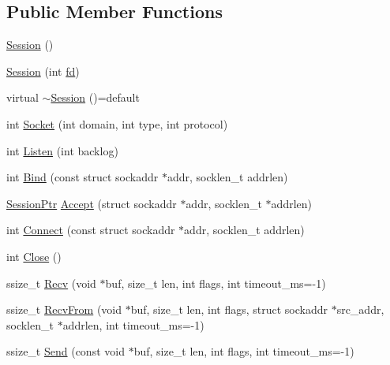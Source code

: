 \subsection*{Public Member Functions}
\begin{DoxyCompactItemize}
\item 
\hyperlink{classapollo_1_1cyber_1_1io_1_1Session_a2e33227015f8c9550a460927d1459152}{Session} ()
\item 
\hyperlink{classapollo_1_1cyber_1_1io_1_1Session_af0c871498862dad8be0a49d49cfb2961}{Session} (int \hyperlink{classapollo_1_1cyber_1_1io_1_1Session_aec8faaa2371913967925e7252a02e985}{fd})
\item 
virtual \hyperlink{classapollo_1_1cyber_1_1io_1_1Session_a625811741be5b68f5f862148ff6e9b3a}{$\sim$\-Session} ()=default
\item 
int \hyperlink{classapollo_1_1cyber_1_1io_1_1Session_afc19fa1fb169c4e45fa7fd8bd290b7ad}{Socket} (int domain, int type, int protocol)
\item 
int \hyperlink{classapollo_1_1cyber_1_1io_1_1Session_a46a8b85f7962f93a735ae91769cffca6}{Listen} (int backlog)
\item 
int \hyperlink{classapollo_1_1cyber_1_1io_1_1Session_a8cdfa3b205b6f3539a179388fb416c9a}{Bind} (const struct sockaddr $\ast$addr, socklen\-\_\-t addrlen)
\item 
\hyperlink{classapollo_1_1cyber_1_1io_1_1Session_a1dff3f4dc860a04ae4a7a0c9d0e8de4f}{Session\-Ptr} \hyperlink{classapollo_1_1cyber_1_1io_1_1Session_a63db2f72fe4c034d982a92532ab8ed6b}{Accept} (struct sockaddr $\ast$addr, socklen\-\_\-t $\ast$addrlen)
\item 
int \hyperlink{classapollo_1_1cyber_1_1io_1_1Session_ae86ffa6d078adb9d223ff72c8460fb16}{Connect} (const struct sockaddr $\ast$addr, socklen\-\_\-t addrlen)
\item 
int \hyperlink{classapollo_1_1cyber_1_1io_1_1Session_a9dbc40f13c58d5aa1c760228b7d68df5}{Close} ()
\item 
ssize\-\_\-t \hyperlink{classapollo_1_1cyber_1_1io_1_1Session_a9173bcc8c7faa52bf3128f6cd6e47899}{Recv} (void $\ast$buf, size\-\_\-t len, int flags, int timeout\-\_\-ms=-\/1)
\item 
ssize\-\_\-t \hyperlink{classapollo_1_1cyber_1_1io_1_1Session_a0df623d371f8c370af437e1ebbc1b05e}{Recv\-From} (void $\ast$buf, size\-\_\-t len, int flags, struct sockaddr $\ast$src\-\_\-addr, socklen\-\_\-t $\ast$addrlen, int timeout\-\_\-ms=-\/1)
\item 
ssize\-\_\-t \hyperlink{classapollo_1_1cyber_1_1io_1_1Session_ae0384c6e9dba4f075d9a9f3435036334}{Send} (const void $\ast$buf, size\-\_\-t len, int flags, int timeout\-\_\-ms=-\/1)

\end{DoxyCompactItemize}
